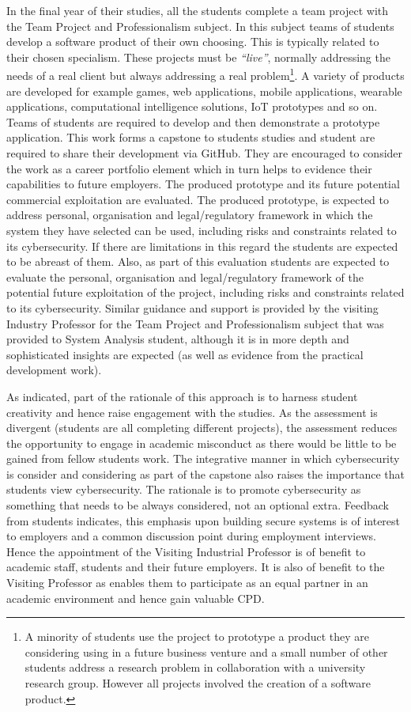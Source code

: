 \documentclass[conference]{IEEEtran}
\begin{document}
In the final year of their studies, all the students complete a team
project with the Team Project and Professionalism subject. In this
subject teams of students develop a software product of their own
choosing. This is typically related to their chosen specialism. These
projects must be {\em``live''}, normally addressing the needs of a
real client but always addressing a real problem\footnote{A minority
of students use the project to prototype a product they are
considering using in a future business venture and a small number of
other students address a research problem in collaboration with a
university research group. However all projects involved the creation
of a software product.}. A variety of products are developed for
example games, web applications, mobile applications, wearable
applications, computational intelligence solutions, IoT prototypes and
so on. Teams of students are required to develop and then demonstrate
a prototype application. This work forms a capstone to students
studies and student are required to share their development via
GitHub. They are encouraged to consider the work as a career portfolio
element which in turn helps to evidence their capabilities to future
employers. The produced prototype and its future potential commercial
exploitation are evaluated. The produced prototype, is expected to
address personal, organisation and legal/regulatory framework in which
the system they have selected can be used, including risks and
constraints related to its cybersecurity. If there are limitations in
this regard the students are expected to be abreast of them. Also, as
part of this evaluation students are expected to evaluate the
personal, organisation and legal/regulatory framework of the potential
future exploitation of the project, including risks and constraints
related to its cybersecurity. Similar guidance and support is provided
by the visiting Industry Professor for the Team Project and
Professionalism subject that was provided to System Analysis student,
although it is in more depth and sophisticated insights are expected
(as well as evidence from the practical development work).

As indicated, part of the rationale of this approach is to harness
student creativity and hence raise engagement with the studies. As the
assessment is divergent {\cite{Bradley2016}} (students are all
completing different projects), the assessment reduces the opportunity
to engage in academic misconduct as there would be little to be gained
from fellow students work. The integrative manner in which
cybersecurity is consider and considering as part of the capstone also
raises the importance that students view cybersecurity. The rationale
is to promote cybersecurity as something that needs to be always
considered, not an optional extra. Feedback from students indicates,
this emphasis upon building secure systems is of interest to employers
and a common discussion point during employment interviews. Hence the
appointment of the Visiting Industrial Professor is of benefit to
academic staff, students and their future employers. It is also of
benefit to the Visiting Professor as enables them to participate as an
equal partner in an academic environment and hence gain valuable CPD.
\end{document}
